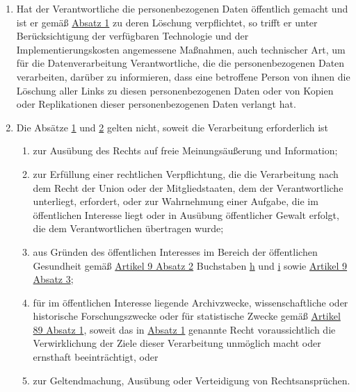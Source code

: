 \begin{enumerate}
\begin{enumerate}
  \end{enumerate}

  \item Hat der Verantwortliche die personenbezogenen Daten öffentlich gemacht und ist er gemäß \hyperref[itm:17-1]
   {Absatz 1} zu deren Löschung verpflichtet, so trifft er unter Berücksichtigung der verfügbaren Technologie und der
   Implementierungskosten angemessene Maßnahmen, auch technischer Art, um für die Datenverarbeitung Verantwortliche,
   die die personenbezogenen Daten verarbeiten, darüber zu informieren, dass eine betroffene Person von ihnen die
   Löschung aller Links zu diesen personenbezogenen Daten oder von Kopien oder Replikationen dieser personenbezogenen
   Daten verlangt hat.
  \label{itm:17-2}

  \item Die Absätze \hyperref[itm:17-1]{1} und \hyperref[itm:17-2]{2} gelten nicht, soweit die Verarbeitung erforderlich
   ist
  \label{itm:17-3}

  \begin{enumerate}
  
    \item zur Ausübung des Rechts auf freie Meinungsäußerung und Information;
    \label{itm:17-3a}

    \item zur Erfüllung einer rechtlichen Verpflichtung, die die Verarbeitung nach dem Recht der Union oder der
     Mitgliedstaaten, dem der Verantwortliche unterliegt, erfordert, oder zur Wahrnehmung einer Aufgabe, die im
     öffentlichen Interesse liegt oder in Ausübung öffentlicher Gewalt erfolgt, die dem Verantwortlichen übertragen
     wurde;
    \label{itm:17-3b}

    \item aus Gründen des öffentlichen Interesses im Bereich der öffentlichen Gesundheit gemäß \hyperref[itm:09-2]
     {Artikel 9 Absatz 2} Buchstaben \hyperref[itm:09-2h]{h} und \hyperref[itm:09-2i]{i} sowie \hyperref[itm:09-3]
     {Artikel 9 Absatz 3};
    \label{itm:17-3c}

    \item für im öffentlichen Interesse liegende Archivzwecke, wissenschaftliche oder historische Forschungszwecke oder
     für statistische Zwecke gemäß \hyperref[itm:89-1]{Artikel 89 Absatz 1}, soweit das in \hyperref[itm:17-1]
     {Absatz 1} genannte Recht voraussichtlich die Verwirklichung der Ziele dieser Verarbeitung unmöglich macht oder
     ernsthaft beeinträchtigt, oder
    \label{itm:17-3d}

    \item zur Geltendmachung, Ausübung oder Verteidigung von Rechtsansprüchen.
    \label{itm:17-3e}

  \end{enumerate}

\end{enumerate}


